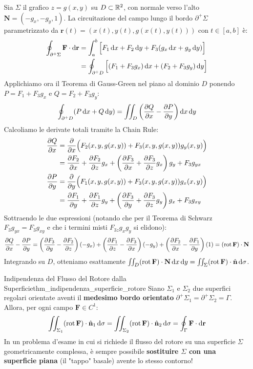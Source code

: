 \begin{dimostrazione}[Dimostrazione per Superfici Cartesiane $z = g(x,y)$]
Sia $\Sigma$ il grafico $z = g(x,y)$ su $D \subset \mathbb{R}^2$, con normale verso l'alto $\mathbf{N} = (-g_x, -g_y, 1)$.
La circuitazione del campo lungo il bordo $\partial^+ \Sigma$ parametrizzato da $\mathbf{r}(t) = (x(t), y(t), g(x(t), y(t)))$ con $t \in [a,b]$ è:
\begin{align*}
\oint_{\partial^+ \Sigma} \mathbf{F} \cdot \mathop{}\!\mathrm{d}\mathbf{r} &= \int_{a}^{b} \Big[ F_1 \mathop{}\!\mathrm{d} x + F_2 \mathop{}\!\mathrm{d} y + F_3 (g_x \mathop{}\!\mathrm{d} x + g_y \mathop{}\!\mathrm{d} y) \Big] \\
&= \oint_{\partial^+ D} \Big[ (F_1 + F_3 g_x) \mathop{}\!\mathrm{d} x + (F_2 + F_3 g_y) \mathop{}\!\mathrm{d} y \Big]
\end{align*}
Applichiamo ora il Teorema di Gauss-Green nel piano al dominio $D$ ponendo $P = F_1 + F_3 g_x$ e $Q = F_2 + F_3 g_y$:
\[
\oint_{\partial^+ D} (P \mathop{}\!\mathrm{d} x + Q \mathop{}\!\mathrm{d} y) = \iint_D \left( \frac{\partial Q}{\partial x} - \frac{\partial P}{\partial y} \right) \mathop{}\!\mathrm{d} x\mathop{}\!\mathrm{d} y
\]
Calcoliamo le derivate totali tramite la Chain Rule:
\begin{align*}
\frac{\partial Q}{\partial x} &= \frac{\partial }{\partial x}\Big( F_2(x,y,g(x,y)) + F_3(x,y,g(x,y)) g_y(x,y) \Big) \\
&= \frac{\partial F_2}{\partial x} + \frac{\partial F_2}{\partial z}g_x + \left( \frac{\partial F_3}{\partial x} + \frac{\partial F_3}{\partial z}g_x \right) g_y + F_3 g_{yx} \\
\frac{\partial P}{\partial y} &= \frac{\partial }{\partial y}\Big( F_1(x,y,g(x,y)) + F_3(x,y,g(x,y)) g_x(x,y) \Big) \\
&= \frac{\partial F_1}{\partial y} + \frac{\partial F_1}{\partial z}g_y + \left( \frac{\partial F_3}{\partial y} + \frac{\partial F_3}{\partial z}g_y \right) g_x + F_3 g_{xy}
\end{align*}
Sottraendo le due espressioni (notando che per il Teorema di Schwarz $F_3 g_{yx} = F_3 g_{xy}$ e che i termini misti $F_{3z} g_x g_y$ si elidono):
\[
\frac{\partial Q}{\partial x} - \frac{\partial P}{\partial y} = \left( \frac{\partial F_3}{\partial y} - \frac{\partial F_2}{\partial z} \right)(-g_x) + \left( \frac{\partial F_1}{\partial z} - \frac{\partial F_3}{\partial x} \right)(-g_y) + \left( \frac{\partial F_2}{\partial x} - \frac{\partial F_1}{\partial y} \right)(1) = (\operatorname{rot} \mathbf{F}) \cdot \mathbf{N}
\]
Integrando su $D$, otteniamo esattamente $\iint_D (\operatorname{rot} \mathbf{F}) \cdot \mathbf{N} \mathop{}\!\mathrm{d} x\mathop{}\!\mathrm{d} y = \iint_\Sigma (\operatorname{rot} \mathbf{F}) \cdot \hat{\mathbf{n}} \mathop{}\!\mathrm{d}\sigma$.
\end{dimostrazione}

\begin{teorema}{Indipendenza del Flusso del Rotore dalla Superficie}{thm_indipendenza_superficie_rotore}
Siano $\Sigma_1$ e $\Sigma_2$ due superfici regolari orientate aventi il \textbf{medesimo bordo orientato} $\partial^+ \Sigma_1 = \partial^+ \Sigma_2 = \Gamma$. Allora, per ogni campo $\mathbf{F} \in C^1$:
\[
\iint_{\Sigma_1} (\operatorname{rot} \mathbf{F}) \cdot \hat{\mathbf{n}}_1 \mathop{}\!\mathrm{d}\sigma = \iint_{\Sigma_2} (\operatorname{rot} \mathbf{F}) \cdot \hat{\mathbf{n}}_2 \mathop{}\!\mathrm{d}\sigma = \oint_{\Gamma} \mathbf{F} \cdot \mathop{}\!\mathrm{d}\mathbf{r}
\]
In un problema d'esame in cui si richiede il flusso del rotore su una superficie $\Sigma$ geometricamente complessa, è sempre possibile \textbf{sostituire $\Sigma$ con una superficie piana} (il "tappo" basale) avente lo stesso contorno!
\end{teorema}

